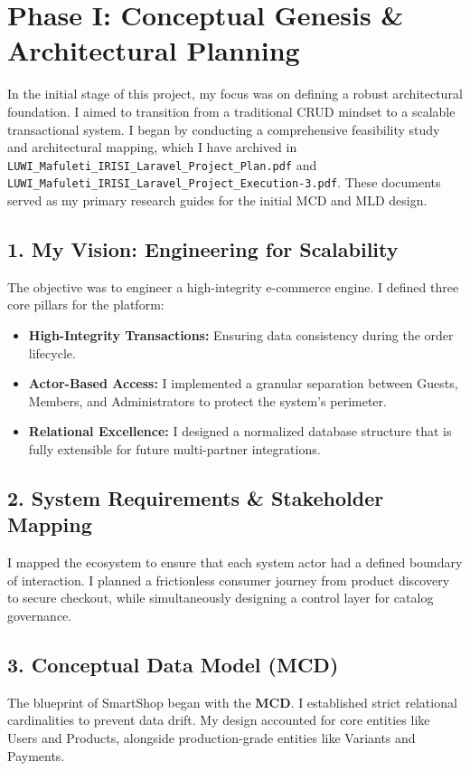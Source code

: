 \documentclass[12pt,a4paper]{article}
\begin{document}
\tableofcontents
\newpage

\section{Phase I: Conceptual Genesis \& Architectural Planning}

In the initial stage of this project, my focus was on defining a robust architectural foundation. I aimed to transition from a traditional CRUD mindset to a scalable transactional system. I began by conducting a comprehensive feasibility study and architectural mapping, which I have archived in \texttt{LUWI\_Mafuleti\_IRISI\_Laravel\_Project\_Plan.pdf} and \texttt{LUWI\_Mafuleti\_IRISI\_Laravel\_Project\_Execution-3.pdf}. These documents served as my primary research guides for the initial MCD and MLD design.

\subsection{1. My Vision: Engineering for Scalability}
The objective was to engineer a high-integrity e-commerce engine. I defined three core pillars for the platform:
\begin{itemize}
    \item \textbf{High-Integrity Transactions:} Ensuring data consistency during the order lifecycle.
    \item \textbf{Actor-Based Access:} I implemented a granular separation between Guests, Members, and Administrators to protect the system's perimeter.
    \item \textbf{Relational Excellence:} I designed a normalized database structure that is fully extensible for future multi-partner integrations.
\end{itemize}

\subsection{2. System Requirements \& Stakeholder Mapping}
I mapped the ecosystem to ensure that each system actor had a defined boundary of interaction. I planned a frictionless consumer journey from product discovery to secure checkout, while simultaneously designing a control layer for catalog governance.

\subsection{3. Conceptual Data Model (MCD)}
The blueprint of SmartShop began with the \textbf{MCD}. I established strict relational cardinalities to prevent data drift. My design accounted for core entities like Users and Products, alongside production-grade entities like Variants and Payments.
\end{document}
